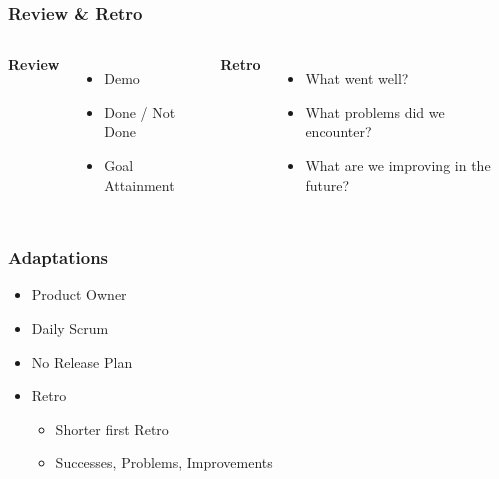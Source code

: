 \begin{frame}
    \frametitle{Review \& Retro}
    \begin{columns}
        \large
        \textbf{Review}
        \begin{itemize}
            \large
            \item Demo
            \item Done / Not Done
            \item Goal Attainment
        \end{itemize}
        \large
        \textbf{Retro}
        \begin{itemize}
            \large
            \item What went well?
            \item What problems did we encounter?
            \item What are we improving in the future?
        \end{itemize}
    \end{columns}
\end{frame}

\begin{frame}
    \frametitle{Adaptations}
    \begin{itemize}
        \large
        \item Product Owner
        \item Daily Scrum
        \item No Release Plan
        \item Retro
              \begin{itemize}
                  \large
                  \item Shorter first Retro
                  \item Successes, Problems, Improvements
              \end{itemize}
    \end{itemize}
\end{frame}
